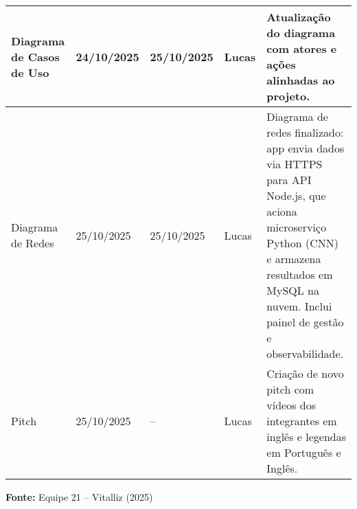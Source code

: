 \begin{center}
\begin{adjustbox}{max width=\textwidth}
\begin{tabular}{|m{3.5cm}|m{2.2cm}|m{2.2cm}|m{3.5cm}|m{6.5cm}|}
Diagrama de Casos de Uso & 24/10/2025 & 25/10/2025 & Lucas & Atualização do diagrama com atores e ações alinhadas ao projeto. \\ \hline

Diagrama de Redes & 25/10/2025 & 25/10/2025 & Lucas & Diagrama de redes finalizado: app envia dados via HTTPS para API Node.js, que aciona microserviço Python (CNN) e armazena resultados em MySQL na nuvem. Inclui painel de gestão e observabilidade. \\ \hline

Pitch & 25/10/2025 & – & Lucas & Criação de novo pitch com vídeos dos integrantes em inglês e legendas em Português e Inglês. \\ \hline

\end{tabular}
\end{adjustbox}

\vspace{0.3em}
\small{\textbf{Fonte:} Equipe 21 – Vitalliz (2025)}

\end{center}